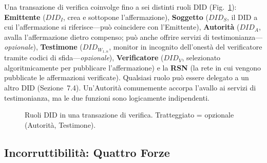 \documentclass[11pt,a4paper,twocolumn]{article}
\begin{document}
Una transazione di verifica coinvolge fino a sei distinti ruoli DID (Fig.~\ref{fig:roles}): \textbf{Emittente} ($DID_I$, crea e sottopone l'affermazione), \textbf{Soggetto} ($DID_S$, il DID a cui l'affermazione si riferisce---può coincidere con l'Emittente), \textbf{Autorità} ($DID_A$, avalla l'affermazione dietro compenso; può anche offrire servizi di testimonianza---\emph{opzionale}), \textbf{Testimone} ($DID_{W_{1..n}}$, monitor in incognito dell'onestà del verificatore tramite codici di sfida---\emph{opzionale}), \textbf{Verificatore} ($DID_V$, selezionato algoritmicamente per pubblicare l'affermazione) e la \textbf{RSN} (la rete in cui vengono pubblicate le affermazioni verificate). Qualsiasi ruolo può essere delegato a un altro DID (Sezione~7.4). Un'Autorità comunemente accorpa l'avallo ai servizi di testimonianza, ma le due funzioni sono logicamente indipendenti.

\begin{figure}[ht]
\centering
{}
\caption{Ruoli DID in una transazione di verifica. Tratteggiato = opzionale (Autorità, Testimone).}
\label{fig:roles}
\end{figure}

\subsection{Incorruttibilità: Quattro Forze}
\end{document}
